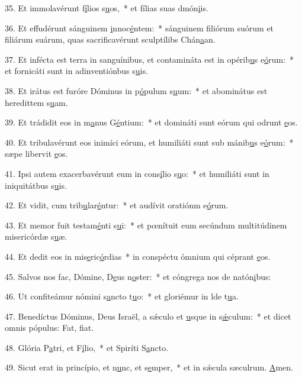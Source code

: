 35. Et immolavérunt f\uline{í}lios s\uline{u}os,~* et fílias suas dmón\uline{i}is.\par 
36. Et effudérunt sánguinem \uline{i}nnoc\uline{é}ntem:~* sánguinem filiórum suórum et filiárum suárum, quas sacrificavérunt sculptílibs Chán\uline{a}an.\par 
37. Et infécta est terra in sanguínibus, et contamináta est in opérib\uline{u}s e\uline{ó}rum:~* et fornicáti sunt in adinventiónbus s\uline{u}is.\par 
38. Et irátus est furóre Dóminus in p\uline{ó}pulum s\uline{u}um:~* et abominátus est heredittem s\uline{u}am.\par 
39. Et trádidit eos in m\uline{a}nus G\uline{é}ntium:~* et domináti sunt eórum qui odrunt \uline{e}os.\par 
40. Et tribulavérunt eos inimíci eórum, et humiliáti sunt sub mánib\uline{u}s e\uline{ó}rum:~* sæpe libervit \uline{e}os.\par 
41. Ipsi autem exacerbavérunt eum in cons\uline{í}lio s\uline{u}o:~* et humiliáti sunt in iniquitátbus s\uline{u}is.\par 
42. Et vidit, cum trib\uline{u}lar\uline{é}ntur:~* et audívit oratiónm e\uline{ó}rum.\par 
43. Et memor fuit testam\uline{é}nti s\uline{u}i:~* et pœnítuit eum secúndum multitúdinem misericórdæ s\uline{u}æ.\par 
44. Et dedit eos in mis\uline{e}ric\uline{ó}rdias~* in conspéctu ómnium qui céprant \uline{e}os.\par 
45. Salvos nos fac, Dómine, D\uline{e}us n\uline{o}ster:~* et cóngrega nos de natón\uline{i}bus:\par 
46. Ut confiteámur nómini s\uline{a}ncto t\uline{u}o:~* et gloriémur in lde t\uline{u}a.\par 
47. Benedíctus Dóminus, Deus Israël, a sǽculo et \uline{u}sque in s\uline{ǽ}culum:~* et dicet omnis pópulus: Fat, f\uline{i}at.\par 
48. Glória P\uline{a}tri, et F\uline{í}lio,~* et Spiríti S\uline{a}ncto.\par 
49. Sicut erat in princípio, et n\uline{u}nc, et s\uline{e}mper,~* et in sǽcula sæculrum. \uline{A}men.\par 
